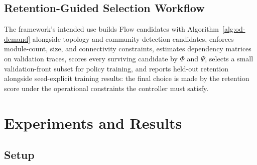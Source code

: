 \documentclass[journal]{IEEEtran}
\theoremstyle{definition}
\begin{document}
\subsection{Retention-Guided Selection Workflow}
\label{sec:workflow}

The framework's intended use builds Flow candidates with Algorithm~\ref{alg:od-demand} alongside topology and community-detection candidates, enforces module-count, size, and connectivity constraints, estimates dependency matrices on validation traces, scores every surviving candidate by $\Phi$ and $\Psi$, selects a small validation-front subset for policy training, and reports held-out retention alongside seed-explicit training results: the final choice is made by the retention score under the operational constraints the controller must satisfy.

\section{Experiments and Results}
\label{sec:experiments}

\subsection{Setup}
\label{sec:setup}
\end{document}
